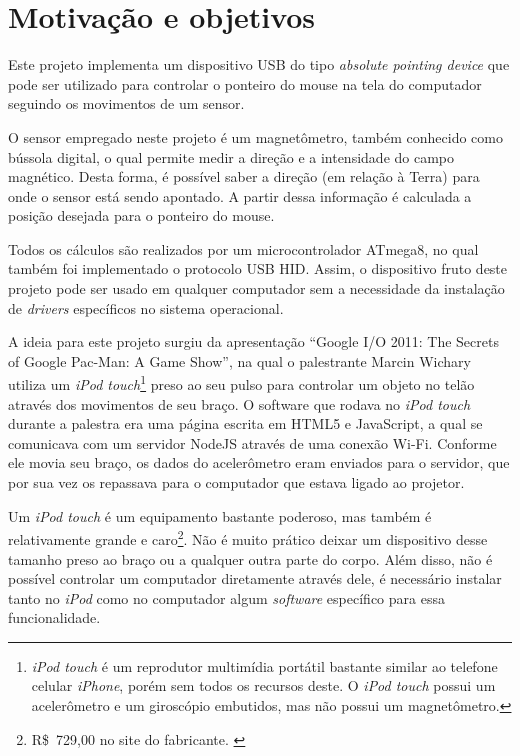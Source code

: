 \documentclass[brazil,pagestart=firstchapter]{abnt}
\begin{document}
\newpage


\section{Motivação e objetivos}
\label{sec:motivacao}

Este projeto implementa um dispositivo \acs{USB} do tipo \textit{absolute
pointing device} que pode ser utilizado para controlar o ponteiro do mouse
na tela do computador seguindo os movimentos de um sensor.

O sensor empregado neste projeto é um magnetômetro, também conhecido como
bússola digital, o qual permite medir a direção e a intensidade do campo
magnético. Desta forma, é possível saber a direção (em relação à Terra) para
onde o sensor está sendo apontado. A partir dessa informação é calculada
a posição desejada para o ponteiro do mouse.

Todos os cálculos são realizados por um microcontrolador ATmega8, no qual
também foi implementado o protocolo \acs{USB} \acs{HID}. Assim, o
dispositivo fruto deste projeto pode ser usado em qualquer computador sem a
necessidade da instalação de \textit{drivers} específicos no sistema
operacional.

A ideia para este projeto surgiu da apresentação ``Google I/O 2011: The
Secrets of Google Pac-Man: A Game Show'', na qual o palestrante Marcin
Wichary utiliza um \textit{iPod touch}\footnote{
	\textit{iPod touch} é um reprodutor multimídia portátil bastante similar
	ao telefone celular \textit{iPhone}, porém sem todos os recursos deste.
	O \textit{iPod touch} possui um acelerômetro e um giroscópio embutidos,
	mas não possui um magnetômetro.
} preso ao seu pulso para controlar um objeto no telão através dos
movimentos de seu braço. \cite[2min29s a 4min40s]{GoogleIO2011} O software
que rodava no \textit{iPod touch} durante a palestra era uma página escrita
em HTML5 e JavaScript, a qual se comunicava com um servidor NodeJS através
de uma conexão Wi-Fi. Conforme ele movia seu braço, os dados do acelerômetro
eram enviados para o servidor, que por sua vez os repassava para o
computador que estava ligado ao projetor.

Um \textit{iPod touch} é um equipamento bastante poderoso, mas também é
relativamente grande e caro\footnote{
	R\$~729,00 no site do fabricante. \cite{AppleStoreiPodTouch}
}. Não é muito prático deixar um dispositivo desse tamanho preso ao braço ou
a qualquer outra parte do corpo. Além disso, não é possível controlar um
computador diretamente através dele, é necessário instalar tanto no
\textit{iPod} como no computador algum \textit{software} específico para
essa funcionalidade.
\end{document}
